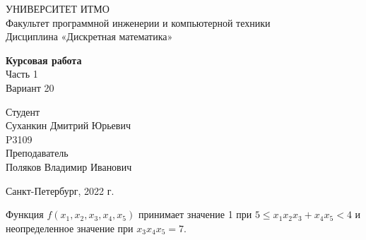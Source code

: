\documentclass{article}
\begin{document}
\begin{center}
    УНИВЕРСИТЕТ ИТМО \\
    Факультет программной инженерии и компьютерной техники \\
    Дисциплина «Дискретная математика»
    
    \vspace{5cm}

    \large
    \textbf{Курсовая работа} \\
    Часть 1 \\
    Вариант 20
\end{center}

\vspace{2cm}

\hfill\begin{minipage}{0.35\linewidth}
Студент \\
Суханкин Дмитрий Юрьевич \\
P3109 \\

Преподаватель \\
Поляков Владимир Иванович
\end{minipage}

\vfill

\begin{center}
    Санкт-Петербург, 2022 г.
\end{center}

\thispagestyle{empty}
\newpage

Функция $f(x_1, x_2, x_3, x_4, x_5)$ принимает значение 1 при $5 \le x_1 x_2 x_3 + x_4 x_5 < 4$ и неопределенное значение при $x_3 x_4 x_5 = 7$.
\end{document}
